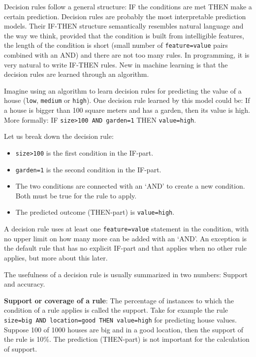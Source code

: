 \documentclass[
  11pt,
]{scrbook}
\providecommand{\tightlist}{%
  \setlength{\itemsep}{0pt}\setlength{\parskip}{0pt}}
\begin{document}
Decision rules follow a general structure:
IF the conditions are met THEN make a certain prediction.
Decision rules are probably the most interpretable prediction models.
Their IF-THEN structure semantically resembles natural language and the way we think, provided that the condition is built from intelligible features, the length of the condition is short (small number of \texttt{feature=value} pairs combined with an AND) and there are not too many rules.
In programming, it is very natural to write IF-THEN rules.
New in machine learning is that the decision rules are learned through an algorithm.

Imagine using an algorithm to learn decision rules for predicting the value of a house (\texttt{low}, \texttt{medium} or \texttt{high}).
One decision rule learned by this model could be:
If a house is bigger than 100 square meters and has a garden, then its value is high.
More formally:
IF \texttt{size\textgreater{}100\ AND\ garden=1} THEN \texttt{value=high}.

Let us break down the decision rule:

\begin{itemize}
\tightlist
\item
  \texttt{size\textgreater{}100} is the first condition in the IF-part.
\item
  \texttt{garden=1} is the second condition in the IF-part.
\item
  The two conditions are connected with an `AND' to create a new condition.
  Both must be true for the rule to apply.
\item
  The predicted outcome (THEN-part) is \texttt{value=high}.
\end{itemize}

A decision rule uses at least one \texttt{feature=value} statement in the condition, with no upper limit on how many more can be added with an `AND'.
An exception is the default rule that has no explicit IF-part and that applies when no other rule applies, but more about this later.

The usefulness of a decision rule is usually summarized in two numbers: Support and accuracy.

\textbf{Support or coverage of a rule}:
The percentage of instances to which the condition of a rule applies is called the support.
Take for example the rule \texttt{size=big\ AND\ location=good\ THEN\ value=high} for predicting house values.
Suppose 100 of 1000 houses are big and in a good location, then the support of the rule is 10\%.
The prediction (THEN-part) is not important for the calculation of support.
\end{document}
